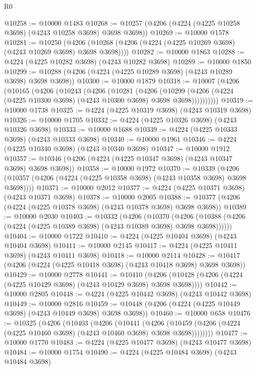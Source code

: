 \begin{lexlean}{R0}
\begin{coremodule}
@10258 := @10000 @1483
@10268 := @10257 (@4206 (@4224 (@4225 @10258 @3698) (@4243 @10258 @3698) @3698 @3698))
@10269 := @10000 @1578
@10281 := @10250
    (@4206 (@10268 (@4206 (@4224 (@4225 @10269 @3698) (@4243 @10269 @3698) @3698 @3698))))
@10282 := @10000 @1863
@10288 := @4224 (@4225 @10282 @3698) (@4243 @10282 @3698)
@10289 := @10000 @1850
@10299 := @10288 (@4206 (@4224 (@4225 @10289 @3698) (@4243 @10289 @3698) @3698 @3698))
@10300 := @10000 @1879
@10318 := @10007
    (@4206
      (@10165
        (@4206
          (@10243
            (@4206
              (@10281
                (@4206
                  (@10299
                    (@4206 (@4224 (@4225 @10300 @3698) (@4243 @10300 @3698) @3698 @3698))))))))))
@10319 := @10000 @1738
@10325 := @4224 (@4225 @10319 @3698) (@4243 @10319 @3698)
@10326 := @10000 @1705
@10332 := @4224 (@4225 @10326 @3698) (@4243 @10326 @3698)
@10333 := @10000 @1688
@10339 := @4224 (@4225 @10333 @3698) (@4243 @10333 @3698)
@10340 := @10000 @1961
@10346 := @4224 (@4225 @10340 @3698) (@4243 @10340 @3698)
@10347 := @10000 @1912
@10357 := @10346 (@4206 (@4224 (@4225 @10347 @3698) (@4243 @10347 @3698) @3698 @3698))
@10358 := @10000 @1972
@10370 := @10339
    (@4206 (@10357 (@4206 (@4224 (@4225 @10358 @3698) (@4243 @10358 @3698) @3698 @3698))))
@10371 := @10000 @2012
@10377 := @4224 (@4225 @10371 @3698) (@4243 @10371 @3698)
@10378 := @10000 @2005
@10388 := @10377 (@4206 (@4224 (@4225 @10378 @3698) (@4243 @10378 @3698) @3698 @3698))
@10389 := @10000 @2030
@10403 := @10332
    (@4206
      (@10370
        (@4206 (@10388 (@4206 (@4224 (@4225 @10389 @3698) (@4243 @10389 @3698) @3698 @3698))))))
@10404 := @10000 @1722
@10410 := @4224 (@4225 @10404 @3698) (@4243 @10404 @3698)
@10411 := @10000 @2145
@10417 := @4224 (@4225 @10411 @3698) (@4243 @10411 @3698)
@10418 := @10000 @2114
@10428 := @10417 (@4206 (@4224 (@4225 @10418 @3698) (@4243 @10418 @3698) @3698 @3698))
@10429 := @10000 @2778
@10441 := @10410
    (@4206 (@10428 (@4206 (@4224 (@4225 @10429 @3698) (@4243 @10429 @3698) @3698 @3698))))
@10442 := @10000 @2805
@10448 := @4224 (@4225 @10442 @3698) (@4243 @10442 @3698)
@10449 := @10000 @2816
@10459 := @10448 (@4206 (@4224 (@4225 @10449 @3698) (@4243 @10449 @3698) @3698 @3698))
@10460 := @10000 @658
@10476 := @10325
    (@4206
      (@10403
        (@4206
          (@10441
            (@4206
              (@10459 (@4206 (@4224 (@4225 @10460 @3698) (@4243 @10460 @3698) @3698 @3698))))))))
@10477 := @10000 @1770
@10483 := @4224 (@4225 @10477 @3698) (@4243 @10477 @3698)
@10484 := @10000 @1754
@10490 := @4224 (@4225 @10484 @3698) (@4243 @10484 @3698)

\end{coremodule}
\end{lexlean}
